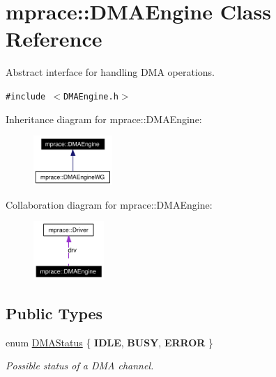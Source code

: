 \hypertarget{classmprace_1_1DMAEngine}{
\section{mprace::DMAEngine Class Reference}
\label{classmprace_1_1DMAEngine}
}
Abstract interface for handling DMA operations.  


{\tt \#include $<$DMAEngine.h$>$}

Inheritance diagram for mprace::DMAEngine:\begin{figure}[H]
\begin{center}
\leavevmode
\includegraphics[width=85pt]{classmprace_1_1DMAEngine__inherit__graph}
\end{center}
\end{figure}
Collaboration diagram for mprace::DMAEngine:\begin{figure}[H]
\begin{center}
\leavevmode
\includegraphics[width=76pt]{classmprace_1_1DMAEngine__coll__graph}
\end{center}
\end{figure}
\subsection*{Public Types}
\begin{CompactItemize}
\item 
enum \hyperlink{classmprace_1_1DMAEngine_w3}{DMAStatus} \{ {\bf IDLE}, 
{\bf BUSY}, 
{\bf ERROR}
 \}
\begin{CompactList}\small\item\em Possible status of a DMA channel. \item\end{CompactList}\end{CompactItemize}
